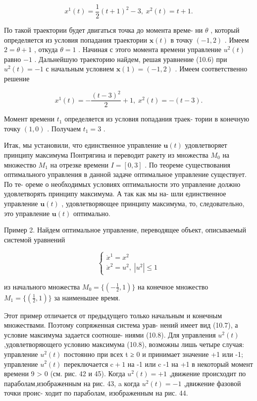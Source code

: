 \documentclass[8pt]{extarticle}
\begin{document}
\[
{x}^{1}\left( t\right)  = \frac{1}{2}{\left( t + 1\right) }^{2} - 3,\;{x}^{2}\left( t\right)  = t + 1.
\]

По такой траектории будет двигаться точка до момента време- ни \(\theta\) , который определяется из условия попадания траектории \(\mathbf{x}\left( t\right)\) в точку \((-1,2)\) . Имеем \(2 = \theta  + 1\) , откуда \(\theta  = 1\) . Начиная с этого момента времени управление \({u}^{2}\left( t\right)\) равно \(-1\) . Дальнейшую траекторию найдем, решая уравнение (10.6) при \({u}^{2}\left( t\right)  =  - 1\) с начальным условием \(\mathbf{x}\left( 1\right)  = (-1,2)\) . Имеем соответственно решение

\[
{x}^{1}\left( t\right)  =  - \frac{{\left( t - 3\right) }^{2}}{2} + 1,\;{x}^{2}\left( t\right)  =  - \left( {t - 3}\right) .
\]

Момент времени \({t}_{1}\) определяется из условия попадания траек- тории в конечную точку \((1,0)\) . Получаем \({t}_{1} = 3\) .

Итак, мы установили, что единственное управление \(\mathbf{u}\left( t\right)\) удовлетворяет принципу максимума Понтрягина и переводит ракету из множества \({M}_{0}\) на множество \({M}_{1}\) на отрезке времени \(I = \left\lbrack  {0,3}\right\rbrack\) . По теореме существования оптимального управления в данной задаче оптимальное управление существует. По те- ореме о необходимых условиях оптимальности это управление должно удовлетворять принципу максимума. А так как мы на- шли единственное управление \(\mathbf{u}\left( t\right)\) , удовлетворяющее принципу максимума, то, следовательно, это управление \(\mathbf{u}\left( t\right)\) оптимально.

Пример 2. Найдем оптимальное управление, переводящее объект, описываемый системой уравнений

\[
\left\{  \begin{array}{l} {\dot{x}}^{1} = {x}^{2} \\  {\dot{x}}^{2} = {u}^{2},\;\left| {u}^{2}\right|  \leq  1 \end{array}\right. \tag{10.12}
\]

из начального множества \({M}_{0} = \{ \left( {-\frac{1}{2},1}\right) \}\) на конечное множество \({M}_{1} = \{ \left( {\frac{1}{2},1}\right) \}\) за наименьшее время.

Этот пример отличается от предыдущего только начальным и конечным множествами. Поэтому сопряженная система урав- нений имеет вид (10.7), а условие максимума задается соотноше- ниями (10.8). Для управления \({u}^{2}\left( t\right)\) ,удовлетворяющего условию максимума (10.8), возможны лишь четыре случая: управление \({u}^{2}\left( t\right)\) постоянно при всех t ≥ 0 и принимает значение +1 или -1; управление \({u}^{2}\left( t\right)\) переключается \(\mathrm{c} + 1\) на -1 или c -1 на +1 в некоторый момент времени 9 > 0 (см. рис. 42 и 45). Когда \({u}^{2}\left( t\right)  =  + 1\) ,движение происходит по параболам,изображенным на рис. 43, a когда \({u}^{2}\left( t\right)  =  - 1\) ,движение фазовой точки проис- ходит по параболам, изображенным на рис. 44.
\end{document}
